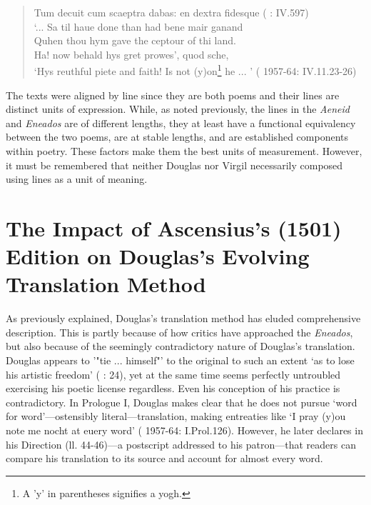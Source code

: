 \documentclass{dhbenelux}
\begin{document}
\pagebreak
\enlargethispage{\baselineskip}
\begin{quote}
Tum decuit cum scaeptra dabas: en dextra fidesque (\citeauthor{virgil1501} \citeyear{virgil1501}: IV.597)\\

`... Sa til haue done than had bene mair ganand\\
Quhen thou hym gave the ceptour of thi land.\\
Ha! now behald hys gret prowes', quod sche,\\
`Hys reuthful piete and faith! Is not (y)on\footnote{A 'y' in parentheses signifies a yogh.} he ... ' (\citeauthor{douglas1957} 1957-64:
IV.11.23-26)
\end{quote}

The texts were aligned by line since they are both poems and their lines
are distinct units of expression. While, as noted previously, the lines
in the \emph{Aeneid} and \emph{Eneados} are of different lengths, they
at least have a functional equivalency between the two poems, are at
stable lengths, and are established components within poetry. These
factors make them the best units of measurement. However, it must be
remembered that neither Douglas nor Virgil necessarily composed using
lines as a unit of meaning.

\section{The Impact of Ascensius’s (1501) Edition on Douglas’s Evolving Translation Method}

As previously explained, Douglas's translation method has eluded
comprehensive description. This is partly because of how critics have
approached the \emph{Eneados}, but also because of the seemingly
contradictory nature of Douglas's translation. Douglas appears to
'"tie ... himself"' to the original to such an extent `as to
lose his artistic freedom' (\citeauthor{petrina2013} \citeyear{petrina2013}: 24), yet at the same time
seems perfectly untroubled exercising his poetic license regardless.
Even his conception of his practice is contradictory. In Prologue I,
Douglas makes clear that he does not pursue `word for word'---ostensibly
literal---translation, making entreaties like `I pray (y)ou note me nocht
at euery word' (\citeauthor{douglas1957} 1957-64: I.Prol.126). However, he later declares in his Direction (ll. 44-46)---a postscript addressed to his patron---that readers can compare
his translation to its source and account for almost every word.
\end{document}
